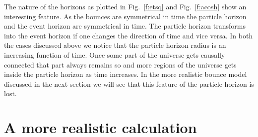 \documentclass[24pt]{article}
\begin{document}
The nature of the horizons as plotted in Fig.~\ref{f:etsq} and
Fig.~\ref{f:acosh} show an interesting feature. As the bounces are
symmetrical in time the particle horizon and the event horizon are
symmetrical in time. The particle horizon transforms into the event
horizon if one changes the direction of time and vice versa.  In both
the cases discussed above we notice that the particle horizon radius
is an increasing function of time. Once some part of the universe gets
causally connected that part always remains so and more regions of the
universe gets inside the particle horizon as time increases. In the
more realistic bounce model discussed in the next section we will see
that this feature of the particle horizon is lost.
\section{A more realistic calculation}
\label{relc}
\end{document}
